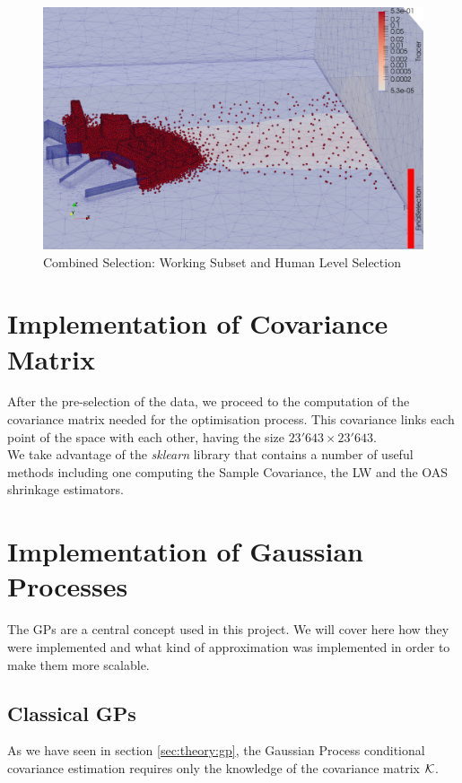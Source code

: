 \begin{figure}[h!]
\centering
    \includegraphics[width = 0.8 \linewidth]{figures/Subset/FinalSelection_zoom}
    \caption{Combined Selection: Working Subset and Human Level Selection}
    \label{fig:combined_selection}
\end{figure}


\section{Implementation of Covariance Matrix}

After the pre-selection of the data, we proceed to the computation of the covariance matrix needed for the optimisation process. This covariance links each point of the space with each other, having the size $23'643 \times 23'643 $.\\

We take advantage of the \textit{sklearn} library that contains a number of useful methods including one computing the Sample Covariance, the LW and the OAS shrinkage estimators. \\



\section{Implementation of Gaussian Processes}

The GPs are a central concept used in this project. We will cover here how they were implemented and what kind of approximation was implemented in order to make them more scalable. 

\subsection{Classical GPs}

As we have seen in section \ref{sec:theory:gp}, the Gaussian Process conditional covariance estimation requires only the knowledge of the covariance matrix $\mathcal{K}$. 

